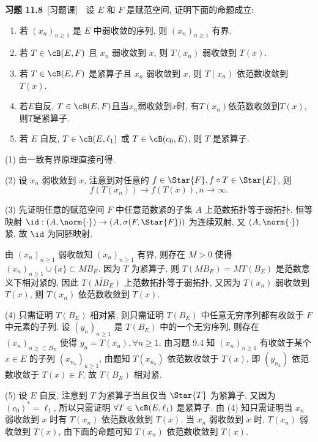 	\textbf{习题 11.8}\ [习题课]\ \ 设 $ E $ 和 $ F $ 是赋范空间, 证明下面的命题成立:
	\begin{enumerate}
		\item 若 $ (x_{n})_{n\geqslant1} $ 是 $ E $ 中弱收敛的序列, 则 $ (x_{n})_{n\geqslant1} $ 有界.
		\item 若 $ T\in\cB(E, F) $ 且 $ x_{n} $ 弱收敛到 $ x $, 则 $ T(x_{n}) $ 弱收敛到 $ T(x) $.
		\item 若 $ T\in\cB(E, F) $ 是紧算子且 $ x_{n} $ 弱收敛到 $ x $, 则 $ T(x_{n}) $ 依范数收敛到 $ T(x) $.
		\item 若$ E $自反, $ T\in\cB(E,F) $且当$ x_n $弱收敛到$ x $时, 有$ T(x_n) $依范数收敛到$ T(x) $, 则$ T $是紧算子. 
		\item 若 $ E $ 自反, $ T\in\cB(E, \ell_{1}) $ 或 $ T\in\cB(c_{0}, E) $, 则 $ T $ 是紧算子.
	\end{enumerate}
	\begin{answer}
		(1) 由一致有界原理直接可得.

		(2) 设 $ x_{n} $ 弱收敛到 $ x $, 注意到对任意的 $ f\in\Star{F}, f\circ T\in\Star{E} $, 则
		\[
			f(T(x_{n}))\to f(T(x)), n\to\infty.
		\]

		(3) 先证明任意的赋范空间 $ F $ 中任意范数紧的子集 $ A $ 上范数拓扑等于弱拓扑. 恒等映射 $ \id: (A, \norm{\cdot})\to (A, \sigma(F, \Star{F})) $ 为连续双射, 又 $ (A, \norm{\cdot}) $ 紧, 故 $ \id $ 为同胚映射.
		
		由 $ (x_{n})_{n\geqslant1} $ 弱收敛知 $ (x_{n})_{n\geqslant1} $ 有界, 则存在 $ M>0 $ 使得 $ (x_{n})_{n\geqslant 1}\cup\{ x \}\subset MB_{E} $. 因为 $ T $ 为紧算子, 则 $ T(MB_{E})=MT(B_{E}) $ 是范数意义下相对紧的, 因此 $ \overline{T(MB_{E})} $ 上范数拓扑等于弱拓扑, 又因为 $ T(x_{n}) $ 弱收敛到 $ T(x) $, 则 $ T(x_{n}) $ 依范数收敛到 $ T(x) $.

		(4) 只需证明 $ T(B_{E}) $ 相对紧, 则只需证明 $ T(B_{E}) $ 中任意无穷序列都有收敛于 $ F $ 中元素的子列. 设 $ (y_{n})_{n\geqslant1} $ 是 $ T(B_{E}) $ 中的一个无穷序列, 则存在 $ (x_{n})_{n\geqslant \subset B_{E}} $ 使得 $ y_{n}=T(x_{n}), \forall n\geqslant1 $. 由习题 9.4 知 $ (x_{n})_{n\geqslant1} $ 有收敛于某个 $ x\in E $ 的子列 $ (x_{n_{k}})_{k\geqslant1} $, 由题知 $ T(x_{n_{k}}) $ 依范数收敛于 $ T(x) $, 即 $ (y_{n_{k}}) $ 依范数收敛于 $ T(x)\in F $, 故 $ T(B_{E}) $ 相对紧.

		(5) 设 $ E $ 自反, 注意到 $ T $ 为紧算子当且仅当 $ \Star{T} $ 为紧算子, 又因为 $ (c_{0})^{*}=\ell_{1} $, 所以只需证明 $ \forall T\in \cB(E, \ell_{1}) $ 是紧算子. 由 (4) 知只需证明当 $ x_{n} $ 弱收敛到 $ x $ 时有 $ T(x_{n}) $ 依范数收敛到 $ T(x) $. 当 $ x_{n} $ 弱收敛到 $ x $ 时, $ T(x_{n}) $ 弱收敛到 $ T(x) $, 由下面的命题可知 $ T(x_{n}) $ 依范数收敛到 $ T(x) $.\qedhere
	\end{answer}

